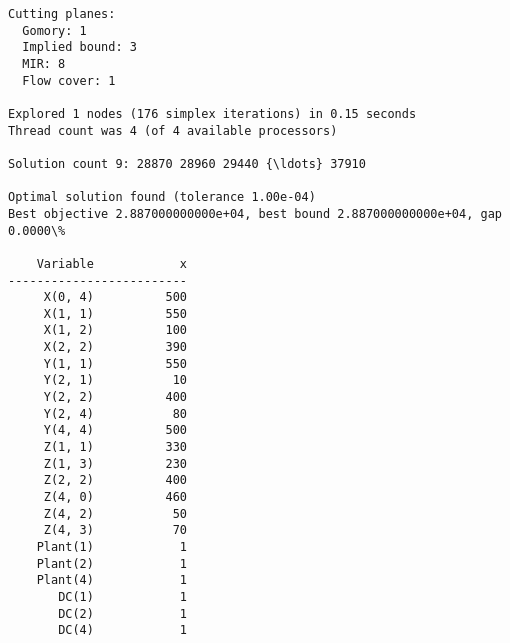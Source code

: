 \documentclass[11pt]{article}
\begin{document}
\begin{Verbatim}[commandchars=\\\{\}]
Cutting planes:
  Gomory: 1
  Implied bound: 3
  MIR: 8
  Flow cover: 1

Explored 1 nodes (176 simplex iterations) in 0.15 seconds
Thread count was 4 (of 4 available processors)

Solution count 9: 28870 28960 29440 {\ldots} 37910

Optimal solution found (tolerance 1.00e-04)
Best objective 2.887000000000e+04, best bound 2.887000000000e+04, gap 0.0000\%

    Variable            x 
-------------------------
     X(0, 4)          500 
     X(1, 1)          550 
     X(1, 2)          100 
     X(2, 2)          390 
     Y(1, 1)          550 
     Y(2, 1)           10 
     Y(2, 2)          400 
     Y(2, 4)           80 
     Y(4, 4)          500 
     Z(1, 1)          330 
     Z(1, 3)          230 
     Z(2, 2)          400 
     Z(4, 0)          460 
     Z(4, 2)           50 
     Z(4, 3)           70 
    Plant(1)            1 
    Plant(2)            1 
    Plant(4)            1 
       DC(1)            1 
       DC(2)            1 
       DC(4)            1 

    \end{Verbatim}


    
    
    
    
\end{document}
